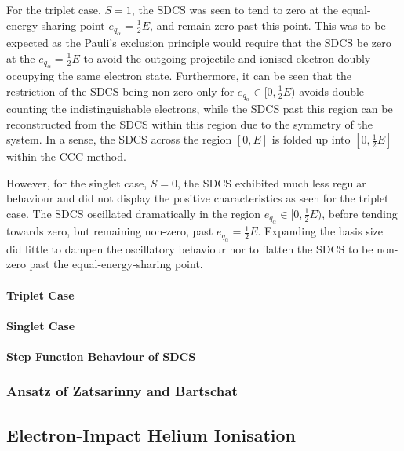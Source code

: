 \documentclass[draft]{article}
\begin{document}
For the triplet case, $S = 1$, the SDCS was seen to tend to zero at the
equal-energy-sharing point $e_{q_{\alpha}} = \tfrac{1}{2} E$, and remain zero
past this point.
This was to be expected as the Pauli's exclusion principle would require that
the SDCS be zero at the $e_{q_{\alpha}} = \tfrac{1}{2} E$ to avoid the outgoing
projectile and ionised electron doubly occupying the same electron state.
Furthermore, it can be seen that the restriction of the SDCS being non-zero only
for $e_{q_{\alpha}} \in [0, \tfrac{1}{2} E)$ avoids double counting the
indistinguishable electrons, while the SDCS past this region can be
reconstructed from the SDCS within this region due to the symmetry of the
system.
In a sense, the SDCS across the region $[0, E]$ is folded up into
$[0, \tfrac{1}{2} E]$ within the CCC method.

However, for the singlet case, $S = 0$, the SDCS exhibited much less regular
behaviour and did not display the positive characteristics as seen for the
triplet case.
The SDCS oscillated dramatically in the region
$e_{q_{\alpha}} \in [0, \tfrac{1}{2} E)$, before tending towards zero, but
remaining non-zero, past $e_{q_{\alpha}} = \tfrac{1}{2} E$.
Expanding the basis size did little to dampen the oscillatory behaviour nor to
flatten the SDCS to be non-zero past the equal-energy-sharing point.


\paragraph{Triplet Case}
\label{sec:e-h-triplet}

\paragraph{Singlet Case}
\label{sec:e-h-singlet}

\paragraph{Step Function Behaviour of SDCS}
\label{sec:e-h-sdcs}

\subsubsection{Ansatz of Zatsarinny and Bartschat}
\label{sec:e-h-ecs-calculations}

\subsection{Electron-Impact Helium Ionisation}
\label{sec:e-he-ionisation}
\end{document}
